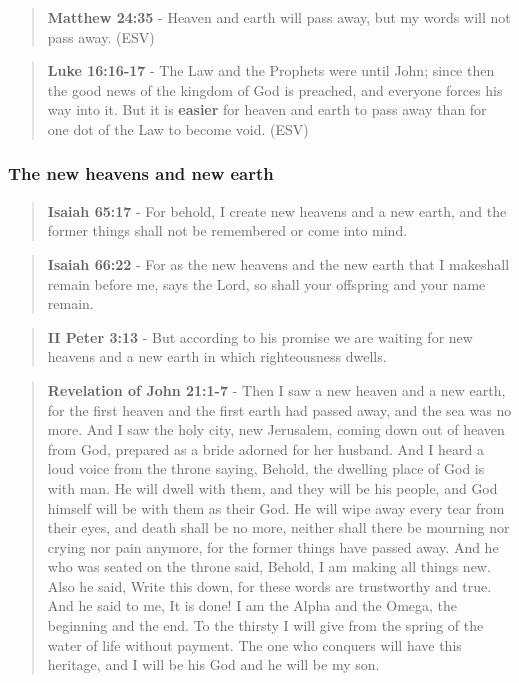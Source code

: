\documentclass[11pt]{article}
\begin{document}
\begin{quote}
\textbf{Matthew 24:35} - Heaven and earth will pass away, but my words will not pass away. (ESV)
\end{quote}

\begin{quote}
\textbf{Luke 16:16-17} -  The Law and the Prophets were until John; since then the good news of the kingdom of God is preached, and everyone forces his way into it.  But it is \textbf{easier} for heaven and earth to pass away than for one dot of the Law to become void. (ESV)
\end{quote}

\subsubsection{The new heavens and new earth}
\label{sec:org0ab2a36}
\begin{quote}
\textbf{Isaiah 65:17} - For behold, I create new heavens and a new earth, and the former things shall not be remembered or come into mind.
\end{quote}

\begin{quote}
\textbf{Isaiah 66:22} - For as the new heavens and the new earth that I makeshall remain before me, says the Lord, so shall your offspring and your name remain.
\end{quote}

\begin{quote}
\textbf{II Peter 3:13} - But according to his promise we are waiting for new heavens and a new earth in which righteousness dwells.
\end{quote}

\begin{quote}
\textbf{Revelation of John 21:1-7} - Then I saw a new heaven and a new earth, for the first heaven and the first earth had passed away, and the sea was no more. And I saw the holy city, new Jerusalem, coming down out of heaven from God, prepared as a bride adorned for her husband. And I heard a loud voice from the throne saying, Behold, the dwelling place of God is with man. He will dwell with them, and they will be his people, and God himself will be with them as their God. He will wipe away every tear from their eyes, and death shall be no more, neither shall there be mourning nor crying nor pain anymore, for the former things have passed away. And he who was seated on the throne said, Behold, I am making all things new. Also he said, Write this down, for these words are trustworthy and true. And he said to me, It is done! I am the Alpha and the Omega, the beginning and the end. To the thirsty I will give from the spring of the water of life without payment. The one who conquers will have this heritage, and I will be his God and he will be my son.
\end{quote}
\end{document}
